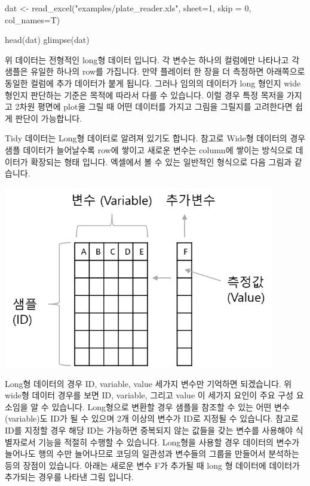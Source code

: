 \documentclass[
  a4paper,
]{book}
\newenvironment{Shaded}{\begin{snugshade}}{\end{snugshade}}
\newcommand{\AttributeTok}[1]{\textcolor[rgb]{0.40,0.45,0.13}{#1}}
\newcommand{\DecValTok}[1]{\textcolor[rgb]{0.68,0.00,0.00}{#1}}
\newcommand{\FunctionTok}[1]{\textcolor[rgb]{0.28,0.35,0.67}{#1}}
\newcommand{\NormalTok}[1]{\textcolor[rgb]{0.00,0.23,0.31}{#1}}
\newcommand{\OtherTok}[1]{\textcolor[rgb]{0.00,0.23,0.31}{#1}}
\newcommand{\StringTok}[1]{\textcolor[rgb]{0.13,0.47,0.30}{#1}}
\begin{document}
\begin{Shaded}
\begin{Highlighting}[]
\NormalTok{dat }\OtherTok{\textless{}{-}} \FunctionTok{read\_excel}\NormalTok{(}\StringTok{"examples/plate\_reader.xls"}\NormalTok{, }\AttributeTok{sheet=}\DecValTok{1}\NormalTok{, }\AttributeTok{skip =} \DecValTok{0}\NormalTok{, }\AttributeTok{col\_names=}\NormalTok{T)}

\FunctionTok{head}\NormalTok{(dat)}
\FunctionTok{glimpse}\NormalTok{(dat)}
\end{Highlighting}
\end{Shaded}

위 데이터는 전형적인 long형 데이터 입니다. 각 변수는 하나의 컬럼에만
나타나고 각 샘플은 유일한 하나의 row를 가집니다. 만약 플레이터 한 장을
더 측정하면 아래쪽으로 동일한 컬럼에 추가 데이터가 붙게 됩니다. 그러나
임의의 데이터가 long 형인지 wide 형인지 판단하는 기준은 목적에 따라서
다를 수 있습니다. 이럴 경우 특정 목저을 가지고 2차원 평면에 plot을 그릴
때 어떤 데이터를 가지고 그림을 그릴지를 고려한다면 쉽게 판단이
가능합니다.

Tidy 데이터는 Long형 데이터로 알려져 있기도 합니다. 참고로 Wide형
데이터의 경우 샘플 데이터가 늘어날수록 row에 쌓이고 새로운 변수는
column에 쌓이는 방식으로 데이터가 확장되는 형태 입니다. 엑셀에서 볼 수
있는 일반적인 형식으로 다음 그림과 같습니다.

\includegraphics[width=4.66667in,height=\textheight]{images/07/05.png}

Long형 데이터의 경우 ID, variable, value 세가지 변수만 기억하면
되겠습니다. 위 wide형 데이터 경우를 보면 ID, variable, 그리고 value 이
세가지 요인이 주요 구성 요소임을 알 수 있습니다. Long형으로 변환할 경우
샘플을 참조할 수 있는 어떤 변수 (variable)도 ID가 될 수 있으며 2개
이상의 변수가 ID로 지정될 수 있습니다. 참고로 ID를 지정할 경우 해당 ID는
가능하면 중복되지 않는 값들을 갖는 변수를 사용해야 식별자로서 기능을
적절히 수행할 수 있습니다. Long형을 사용할 경우 데이터의 변수가 늘어나도
행의 수만 늘어나므로 코딩의 일관성과 변수들의 그룹을 만들어서 분석하는
등의 장점이 있습니다. 아래는 새로운 변수 F가 추가될 때 long 형 데이터에
데이터가 추가되는 경우를 나타낸 그림 입니다.
\end{document}
